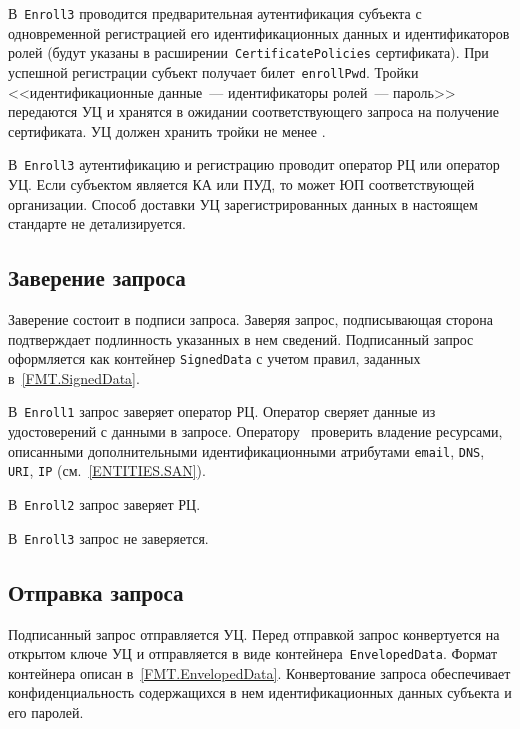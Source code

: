 В~\texttt{Enroll3} проводится предварительная аутентификация
субъекта с одновременной регистрацией его идентификационных данных
и идентификаторов ролей (будут указаны в 
расширении~\texttt{CertificatePolicies} сертификата).   
При успешной регистрации субъект получает билет~\texttt{enrollPwd}. 
Тройки <<идентификационные данные~--- идентификаторы ролей~--- пароль>> 
передаются УЦ и хранятся в ожидании соответствующего запроса на получение 
сертификата. УЦ должен хранить тройки не менее .

В~\texttt{Enroll3} аутентификацию и регистрацию проводит оператор РЦ или 
оператор УЦ. Если субъектом является КА или ПУД, то  
может ЮП соответствующей организации.
%
Способ доставки УЦ зарегистрированных данных в настоящем стандарте 
не детализируется.

\subsection{Заверение запроса}\label{PROCESSES.Enroll.Signed}

Заверение состоит в подписи запроса. Заверяя запрос,
подписывающая сторона подтверждает подлинность указанных в нем сведений.
Подписанный запрос оформляется как контейнер \texttt{SignedData}
с учетом правил, заданных в~\ref{FMT.SignedData}. 

В~\texttt{Enroll1} запрос заверяет оператор РЦ.
Оператор сверяет данные из удостоверений с данными в запросе.
%
Оператору~ проверить владение ресурсами, описанными
дополнительными идентификационными атрибутами \texttt{email}, \texttt{DNS},
\texttt{URI}, \texttt{IP} (см.~\ref{ENTITIES.SAN}).

В~\texttt{Enroll2} запрос заверяет РЦ.

В~\texttt{Enroll3} запрос не заверяется.

\subsection{Отправка запроса}\label{PROCESSES.Enroll.Enveloped}

Подписанный запрос отправляется УЦ. Перед отправкой запрос конвертуется на 
открытом ключе УЦ и отправляется в виде контейнера~\texttt{EnvelopedData}. 
Формат контейнера описан в~\ref{FMT.EnvelopedData}. 
Конвертование запроса обеспечивает конфиденциальность содержащихся в нем 
идентификационных данных субъекта и его паролей.  

